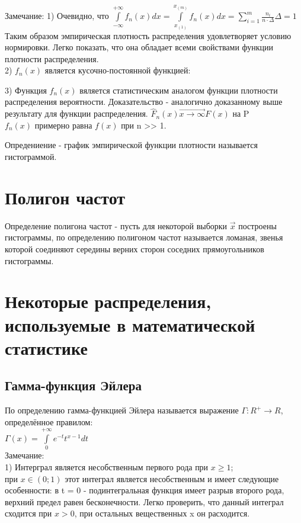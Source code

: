 Замечание:
1) Очевидно, что $\int\limits_{-\infty}^{+\infty} f_{n} (x) dx = \int\limits_{x_{(1)}}^{x_{(m)}} f_{n} (x) dx = \sum\limits_{i=1}^{m}\frac{n_{i}}{n \cdot \Delta} \Delta = 1$\\
Таким образом эмпирическая плотность распределения удовлетворяет условию нормировки. Легко показать, что она обладает всеми свойствами функции плотности распределения.\\
2) $f_{n}(x)$ является кусочно-постоянной функцией:
\begin{figure}[H]
	\center{\texttt{[image: 5\_3]}}
\end{figure}

3) Функция $f_{n}(x)$ вяляется статистическим аналогом функции плотности распределения вероятности. Доказательство - аналогично доказанному выше результату для функции распределения. $\hat{F}_{n}(x) \overrightarrow{x \rightarrow \infty} F(x)$ на P\\

$f_{n}(x)$ примерно равна $f(x)$ при n >> 1.

Опредениение - график эмпирической функции плотности называется гистограммой.

\section{Полигон частот}
Определение полигона частот - пусть для некоторой выборки $\overrightarrow{x}$ построены гистограммы, по определению полигоном частот называется ломаная, звенья которой соединяют середины верних сторон соседних прямоугольников гистограммы.
\begin{figure}[H]
	\center{\texttt{[image: 5\_4]}}
\end{figure}

\section{Некоторые распределения, используемые в математической статистике}
\subsection{Гамма-функция Эйлера}
По определению гамма-функцией Эйлера называется выражение $\Gamma: R^{+} \rightarrow R$, определённое правилом:\\
$\Gamma(x) = \int\limits_{0}^{+\infty}e^{-t} t^{x-1}dt$\\

Замечание:\\
1) Интерграл является несобственным первого рода при $x \geqslant 1$;\\
при $x \in (0; 1)$ этот интеграл является несобственным и имеет следующие особенности: в t = 0 - подинтегральная функция имеет разрыв второго рода, верхний предел равен бесконечности. Легко проверить, что данный интеграл сходится при $x > 0$, при остальных вещественных x он расходится.\\

